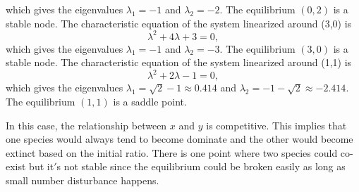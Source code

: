 \documentclass[a4paper,twocolumn]{article} %
\begin{document}
which gives the eigenvalues $\lambda_1 = -1$ and $\lambda_2 = -2$. The equilibrium $(0,2)$ is a stable node. 
The characteristic equation of the system linearized around \mbox{(3,0)} is
\begin{equation*}
    \lambda^2 +4 \lambda + 3 = 0,
\end{equation*}
which gives the eigenvalues $\lambda_1 = -1$ and $\lambda_2 = -3$. The equilibrium $(3,0)$ is a stable node.
The characteristic equation of the system linearized around \mbox{(1,1)} is
\begin{equation*}
    \lambda^2 +2 \lambda - 1 = 0,
\end{equation*}
which gives the eigenvalues $\lambda_1 = \sqrt{2} -1 \approx 0.414$ and $\lambda_2 = -1 -\sqrt{2} \approx -2.414$. The equilibrium $(1,1)$ is a saddle point.


In this case, the relationship between $x$ and $y$ is competitive. This implies that one species would always tend to become dominate and the other would become extinct based on the initial ratio. There is one point where two species could co-exist but it$'$s not stable since the equilibrium could be broken easily as long as small number disturbance happens.  
\end{document}
